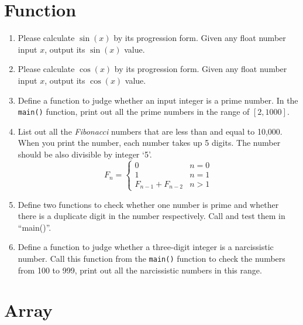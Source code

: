 \documentclass[11pt]{article}
\begin{document}
\section{Function}

\begin{enumerate}
    \item Please calculate $\sin(x)$ by its progression form. Given any float number input $x$, output its $\sin(x)$ value.
    \item Please calculate $\cos(x)$ by its progression form. Given any float number input $x$, output its $\cos(x)$ value.
    \item Define a function to judge whether an input integer is a prime number. In the \texttt{main()} function, print out all the prime numbers in the range of $[2, 1000]$.
    \item List out all the \textit{Fibonacci} numbers that are less than and equal to 10,000. When you print the number, each number takes up 5 digits. The number should be also divisible by integer `5’.
    \begin{equation}
F_n = 
\begin{cases} 
0 & n = 0 \\
1 & n = 1 \\
F_{n-1} + F_{n-2} & n > 1 
\end{cases}
\end{equation}

    \item Define two functions to check whether one number is prime and whether there is a duplicate digit in the number respectively. Call and test them in ``main()''.
    \item Define a function to judge whether a three-digit integer is a narcissistic number. Call this function from the \texttt{main()} function to check the numbers from 100 to 999, print out all the narcissistic numbers in this range.
\end{enumerate}

\section{Array}
\end{document}
